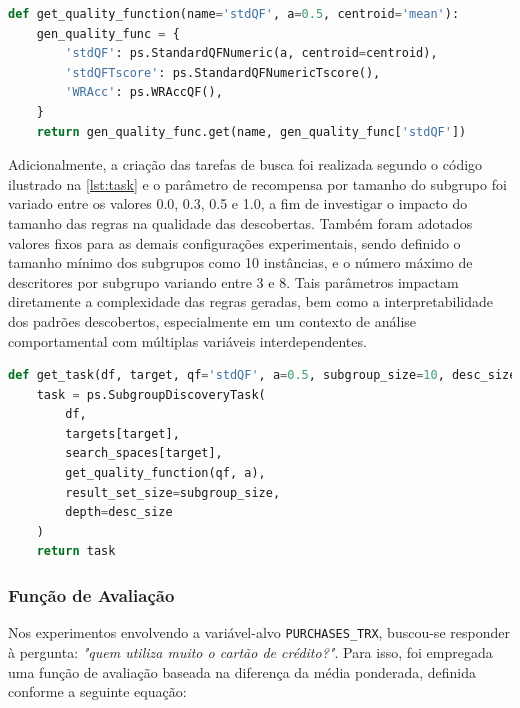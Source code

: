 \documentclass[12pt]{article}
\begin{document}
\begin{center}
\begin{lstlisting}[language=Python, caption={Função auxiliar para seleção da métrica de qualidade utilizada em cada experimento.}, label={lst:qualityfunc}]
def get_quality_function(name='stdQF', a=0.5, centroid='mean'):
    gen_quality_func = {
        'stdQF': ps.StandardQFNumeric(a, centroid=centroid),
        'stdQFTscore': ps.StandardQFNumericTscore(),
        'WRAcc': ps.WRAccQF(),
    }
    return gen_quality_func.get(name, gen_quality_func['stdQF'])
\end{lstlisting}
\end{center}

Adicionalmente, a criação das tarefas de busca foi realizada segundo o código ilustrado na \autoref{lst:task} e o parâmetro de recompensa por tamanho do subgrupo foi variado entre os valores 0.0, 0.3, 0.5 e 1.0, a fim de investigar o impacto do tamanho das regras na qualidade das descobertas. Também foram adotados valores fixos para as demais configurações experimentais, sendo definido o tamanho mínimo dos subgrupos como 10 instâncias, e o número máximo de descritores por subgrupo variando entre 3 e 8. Tais parâmetros impactam diretamente a complexidade das regras geradas, bem como a interpretabilidade dos padrões descobertos, especialmente em um contexto de análise comportamental com múltiplas variáveis interdependentes. 

\begin{center}
\begin{lstlisting}[language=Python, caption={Criação da tarefa de descoberta de subgrupos}, label={lst:task}]
def get_task(df, target, qf='stdQF', a=0.5, subgroup_size=10, desc_size=3):
    task = ps.SubgroupDiscoveryTask(
        df,
        targets[target],
        search_spaces[target],
        get_quality_function(qf, a),
        result_set_size=subgroup_size,
        depth=desc_size
    )
    return task
\end{lstlisting}
\end{center}

\subsubsection{Função de Avaliação}

\hspace{1.2cm}Nos experimentos envolvendo a variável-alvo \texttt{PURCHASES\_TRX}, buscou-se responder à pergunta: \textit{"quem utiliza muito o cartão de crédito?"}. Para isso, foi empregada uma função de avaliação baseada na diferença da média ponderada, definida conforme a seguinte equação:
\end{document}
